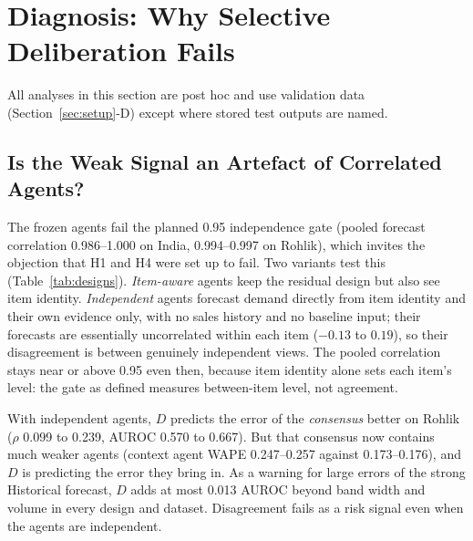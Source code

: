 \documentclass[conference]{IEEEtran}
\begin{document}
\section{Diagnosis: Why Selective Deliberation Fails}\label{sec:diagnosis}

All analyses in this section are post hoc and use validation data
(Section~\ref{sec:setup}-D) except where stored test outputs are named.

\subsection{Is the Weak Signal an Artefact of Correlated Agents?}
The frozen agents fail the planned 0.95 independence gate (pooled forecast correlation 0.986--1.000
on India, 0.994--0.997 on Rohlik), which invites the objection that H1 and H4 were set up to fail.
Two variants test this (Table~\ref{tab:designs}). \emph{Item-aware} agents keep the residual design
but also see item identity. \emph{Independent} agents forecast demand directly from item identity and
their own evidence only, with no sales history and no baseline input; their forecasts are
essentially uncorrelated within each item ($-0.13$ to $0.19$), so their disagreement is between
genuinely independent views. The pooled correlation stays near or above 0.95 even then, because item
identity alone sets each item's level: the gate as defined measures between-item level, not
agreement.

With independent agents, $D$ predicts the error of the \emph{consensus} better on Rohlik ($\rho$
0.099 to 0.239, AUROC 0.570 to 0.667). But that consensus now contains much weaker agents (context
agent WAPE 0.247--0.257 against 0.173--0.176), and $D$ is predicting the error they bring in. As a
warning for large errors of the strong Historical forecast, $D$ adds at most 0.013 AUROC beyond band
width and volume in every design and dataset. Disagreement fails as a risk signal even when the
agents are independent.
\end{document}
